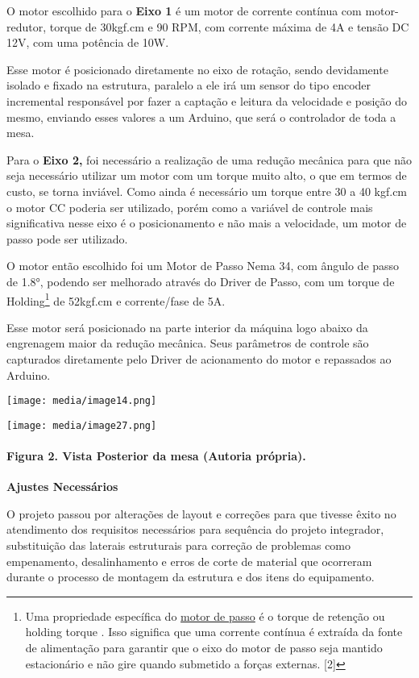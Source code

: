 \documentclass[]{article}
\let\oldparagraph\paragraph
\renewcommand{\paragraph}[1]{\oldparagraph{#1}\mbox{}}
\begin{document}
O motor escolhido para o \textbf{Eixo 1} é um motor de corrente contínua
com motor-redutor, torque de 30kgf.cm e 90 RPM, com corrente máxima de
4A e tensão DC 12V, com uma potência de 10W.

Esse motor é posicionado diretamente no eixo de rotação, sendo
devidamente isolado e fixado na estrutura, paralelo a ele irá um sensor
do tipo encoder incremental responsável por fazer a captação e leitura
da velocidade e posição do mesmo, enviando esses valores a um Arduino,
que será o controlador de toda a mesa.

Para o \textbf{Eixo 2,} foi necessário a realização de uma redução
mecânica para que não seja necessário utilizar um motor com um torque
muito alto, o que em termos de custo, se torna inviável. Como ainda é
necessário um torque entre 30 a 40 kgf.cm o motor CC poderia ser
utilizado, porém como a variável de controle mais significativa nesse
eixo é o posicionamento e não mais a velocidade, um motor de passo pode
ser utilizado.

O motor então escolhido foi um Motor de Passo Nema 34, com ângulo de
passo de 1.8°, podendo ser melhorado através do Driver de Passo, com um
torque de Holding\footnote{Uma propriedade específica do
  \href{https://www.sciencedirect.com/topics/engineering/stepper-motor}{motor
  de passo} é o torque de retenção ou holding torque . Isso significa
  que uma corrente contínua é extraída da fonte de alimentação para
  garantir que o eixo do motor de passo seja mantido estacionário e não
  gire quando submetido a forças externas. {[}2{]}} de 52kgf.cm e
corrente/fase de 5A.

Esse motor será posicionado na parte interior da máquina logo abaixo da
engrenagem maior da redução mecânica. Seus parâmetros de controle são
capturados diretamente pelo Driver de acionamento do motor e repassados
ao Arduino.

\texttt{[image: media/image14.png]}

\texttt{[image: media/image27.png]}

\paragraph{Figura 2. Vista Posterior da mesa (Autoria
própria).}\label{figura-2.-vista-posterior-da-mesa-autoria-pruxf3pria.}

\textbf{Ajustes Necessários}

O projeto passou por alterações de layout e correções para que tivesse
êxito no atendimento dos requisitos necessários para sequência do
projeto integrador, substituição das laterais estruturais para correção
de problemas como empenamento, desalinhamento e erros de corte de
material que ocorreram durante o processo de montagem da estrutura e dos
itens do equipamento.
\end{document}
